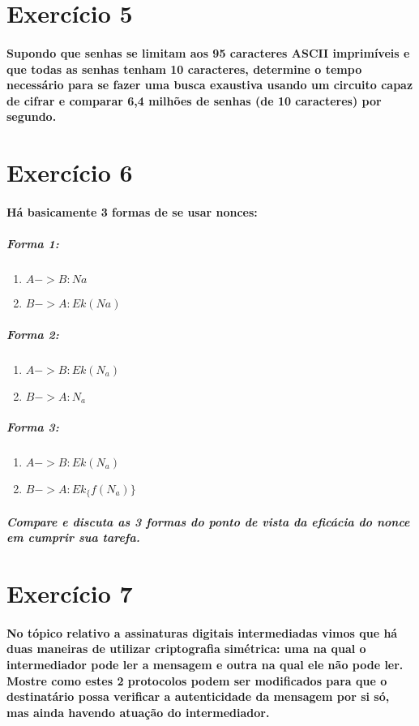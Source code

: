 \documentclass[10pt,a4paper]{report}
\begin{document}
\section*{Exercício 5}
\paragraph{ Supondo que senhas se limitam aos 95 caracteres ASCII imprimíveis e que todas as senhas tenham 10 caracteres, determine o tempo necessário para se fazer uma busca exaustiva usando um circuito capaz de cifrar e comparar 6,4 milhões de senhas (de 10 caracteres) por segundo.}
\section*{Exercício 6}
\paragraph{Há basicamente 3 formas de se usar nonces:}
\subparagraph{Forma 1:}
\begin{enumerate}[(1)]
\item $A -> B : Na$
\item $B -> A : Ek(Na)$
\end{enumerate}
\subparagraph{Forma 2:}
\begin{enumerate}[(1)]
\item $A -> B : Ek(N_a)$
\item $B -> A : N_a$
\end{enumerate}
\subparagraph{Forma 3:}
\begin{enumerate}[(1)]
\item $A -> B : Ek(N_a)$
\item $B -> A : Ek_\{f(N_a)\}$
\end{enumerate}
\subparagraph{Compare e discuta as 3 formas do ponto de vista da eficácia do nonce em cumprir sua tarefa.}
\section*{Exercício 7}
\paragraph{ No tópico relativo a assinaturas digitais intermediadas vimos que há duas maneiras de utilizar criptografia simétrica: uma na qual o intermediador pode ler a mensagem e outra na qual ele não pode ler. Mostre como estes 2 protocolos podem ser modificados para que o destinatário possa verificar a autenticidade da mensagem por si só, mas ainda havendo atuação do intermediador.}
\end{document}
